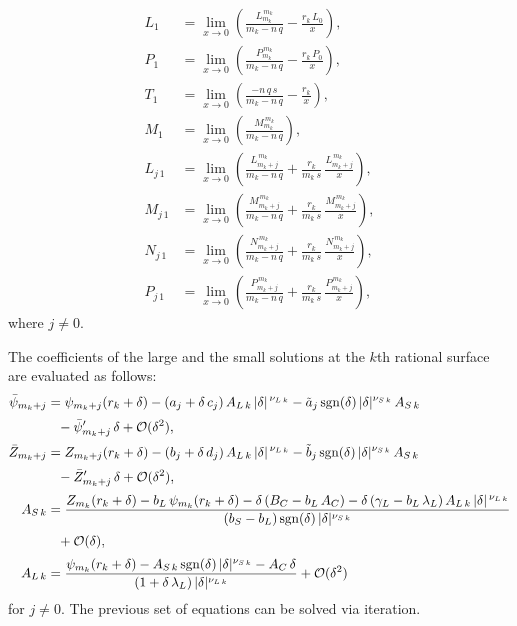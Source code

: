 \documentclass[12pt,prb,aps]{revtex4-1}
\begin{document}
\begin{align}
L_1&= \lim_{x\rightarrow 0}\left(\frac{L_{m_k}^{\,m_k}}{m_k-n\,q}-\frac{r_k\,L_0}{x}\right),\\[0.5ex]
P_1&=  \lim_{x\rightarrow 0}\left(\frac{P_{m_k}^{\,m_k}}{m_k-n\,q}-\frac{r_k\,P_0}{x}\right),\\[0.5ex]
T_1 &= \lim_{x\rightarrow 0}\left(\frac{-n\,q\,s}{m_k-n\,q}-\frac{r_k}{x}\right),\\[0.5ex]
M_1 &= \lim_{x\rightarrow 0}\left(\frac{M_{m_k}^{\,m_k}}{m_k-n\,q}\right),\\[0.5ex]
L_{j\,1}&=\lim_{x\rightarrow 0}\left(\frac{L_{m_k+j}^{\,m_k}}{m_k-n\,q}+\frac{r_k}{m_k\,s}\,\frac{L_{m_k+j}^{\,m_k}}{x}\right),\\[0.5ex]
M_{j\,1}&=\lim_{x\rightarrow 0}\left(\frac{M_{m_k+j}^{\,m_k}}{m_k-n\,q}+\frac{r_k}{m_k\,s}\,\frac{M_{m_k+j}^{\,m_k}}{x}\right),\\[0.5ex]
N_{j\,1}&=\lim_{x\rightarrow 0}\left(\frac{N_{m_k+j}^{\,m_k}}{m_k-n\,q}+\frac{r_k}{m_k\,s}\,\frac{N_{m_k+j}^{\,m_k}}{x}\right),\\[0.5ex]
P_{j\,1}&=\lim_{x\rightarrow 0}\left(\frac{P_{m_k+j}^{\,m_k}}{m_k-n\,q}+\frac{r_k}{m_k\,s}\,\frac{P_{m_k+j}^{\,m_k}}{x}\right),
\end{align}
where $j\neq 0$. 

The coefficients of the large and the small solutions at the $k$th rational surface are evaluated as follows:
\begin{align}
\bar{\psi}_{m_k+j} &= \psi_{m_k+j}(r_k+\delta)- (a_j+\delta\,c_j)\,A_{L\,k}\,|\delta|^{\,\nu_{L\,k}}-\tilde{a}_j\,{\rm sgn}(\delta)\,|\delta|^{\nu_{S\,k}}\,A_{S\,k}\nonumber\\[0.5ex]
&\phantom{=}-\bar{\psi}'_{m_k+j}\,\delta+{\cal O}(\delta^2),\\[0.5ex]
\bar{Z}_{m_k+j}&= Z_{m_k+j}(r_k+\delta)- (b_j+\delta\,d_j)\,A_{L\,k}\,|\delta|^{\,\nu_{L\,k}}-\tilde{b}_j\,{\rm sgn}(\delta)\,|\delta|^{\nu_{S\,k}}\,A_{S\,k}\nonumber\\[0.5ex]
&\phantom{=}-\bar{Z}'_{m_k+j}\,\delta+{\cal O}(\delta^2),\\[0.5ex]
A_{S\,k} &= \frac{Z_{m_k}(r_k+\delta)-b_L\,\psi_{m_k}(r_k+\delta)-\delta\,(B_C-b_L\,A_C)-\delta\,(\gamma_L-b_L\,\lambda_L)\,A_{L\,k}\,|\delta|^{\,\nu_{L\,k}}}{
(b_S-b_L)\,{\rm sgn}(\delta)\,|\delta|^{\nu_{S\,k}}}\nonumber\\[0.5ex]
&\phantom{=}+{\cal O}(\delta),\\[0.5ex]
A_{L\,k} &= \frac{\psi_{m_k}(r_k+\delta)-A_{S\,k}\,{\rm sgn}(\delta)\,|\delta|^{\nu_{S\,k}}-A_C\,\delta}{(1+\delta\,\lambda_L)\,|\delta|^{\nu_{L\,k}}}+{\cal O}(\delta^2)
\end{align}
for $j\neq 0$. The previous set of equations can be solved via iteration.
\end{document}
